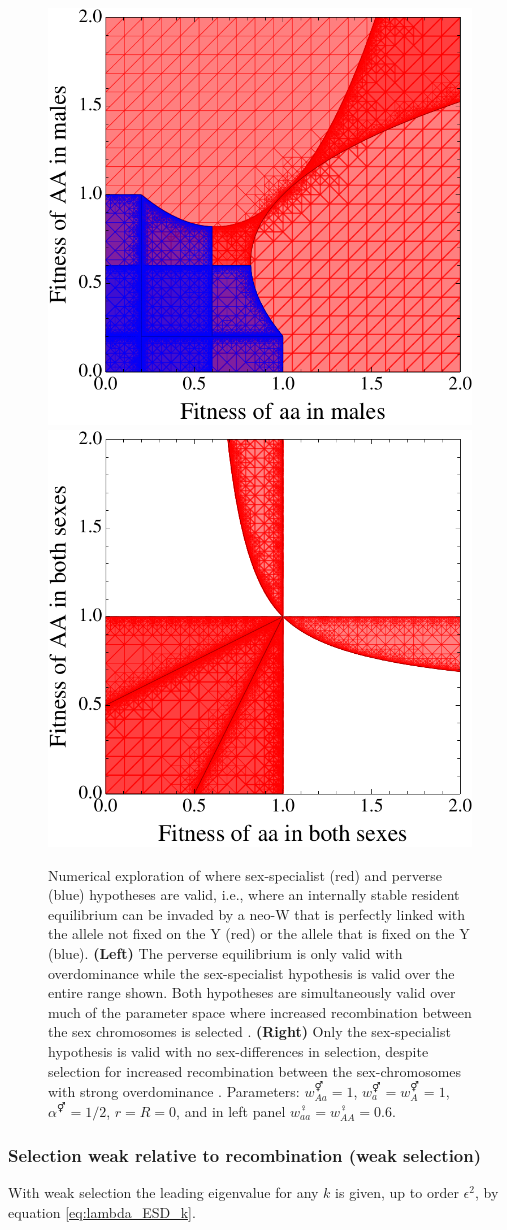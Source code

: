 \documentclass[12pt]{article}
\begin{document}
\begin{figure}[!h]
\centering
\includegraphics[width=0.45\linewidth]{regionplot_2a}
\includegraphics[width=0.45\linewidth]{regionplot_3}\\
\caption{
Numerical exploration of where sex-specialist (red) and perverse (blue) hypotheses are valid, i.e., where an internally stable resident equilibrium can be invaded by a neo-W that is perfectly linked with the allele not fixed on the Y (red) or the allele that is fixed on the Y (blue). 
\textbf{(Left)}
The perverse equilibrium is only valid with overdominance while the sex-specialist hypothesis is valid over the entire range shown.
Both hypotheses are simultaneously valid over much of the parameter space where increased recombination between the sex chromosomes is selected \citep[][figure 2a]{Otto2014}.
\textbf{(Right)}
Only the sex-specialist hypothesis is valid with no sex-differences in selection, despite selection for increased recombination between the sex-chromosomes with strong overdominance \citep[][figure 3]{Otto2014}.
Parameters: $w_{Aa}^\Hermaphrodite = 1$, $w_a^\Hermaphrodite = w_A^\Hermaphrodite = 1$, $\alpha^\Hermaphrodite = 1/2$, $r=R=0$, and in left panel $w_{aa}^\female = w_{AA}^\female = 0.6$.
}
\label{fig:Region_Plots}
\end{figure}

\subsubsection*{Selection weak relative to recombination (weak selection)}

With weak selection the leading eigenvalue for any $k$ is given, up to order $\epsilon^2$, by equation \ref{eq:lambda_ESD_k}.


\newpage

\end{document}
